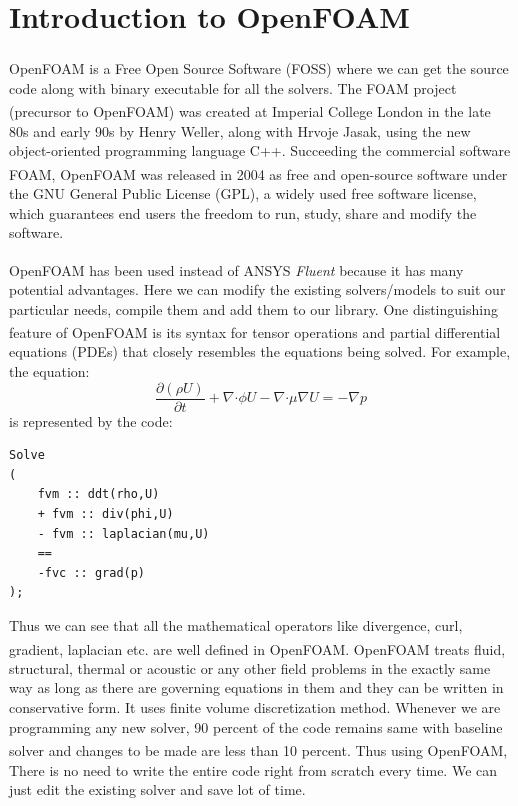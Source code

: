 \chapter{Introduction to OpenFOAM\textsuperscript{\textregistered}}

\label{openfoam}

OpenFOAM\textsuperscript{\textregistered} is a Free Open Source Software (FOSS) where we can get the source code along with binary executable for all the solvers. The FOAM project (precursor to OpenFOAM\textsuperscript{\textregistered}) was created at Imperial College London in the late 80s and early 90s by Henry Weller, along with Hrvoje Jasak, using the new object-oriented programming language C++. Succeeding the commercial software FOAM, OpenFOAM\textsuperscript{\textregistered} was released in 2004 as free and open-source software under the GNU General Public License (GPL), a widely used free software license, which guarantees end users the freedom to run, study, share and modify the software.

OpenFOAM\textsuperscript{\textregistered} has been used instead of ANSYS\textsuperscript{\textregistered} \textit{Fluent} because it has many potential advantages. Here we can modify the existing solvers/models to suit our particular needs, compile them and add them to our library. One distinguishing feature of OpenFOAM\textsuperscript{\textregistered} is its syntax for tensor operations and partial differential equations (PDEs) that closely resembles the equations being solved. For example, the equation: 
\begin{equation}
\dfrac{\partial(\rho U)}{\partial t} + \nabla \boldsymbol{\cdot} \phi U - \nabla \boldsymbol{\cdot} \mu \nabla U = - \nabla p
\end{equation}
is represented by the code: 
\begin{verbatim}
Solve
(
	fvm :: ddt(rho,U)
	+ fvm :: div(phi,U)
	- fvm :: laplacian(mu,U)
	==
	-fvc :: grad(p)
);

\end{verbatim}

Thus we can see that all the mathematical operators like divergence, curl, gradient, laplacian etc. are well defined in OpenFOAM\textsuperscript{\textregistered}. OpenFOAM\textsuperscript{\textregistered} treats fluid, structural, thermal or acoustic or any other field problems in the exactly same way as long as there are governing equations in them and they can be written in conservative form. It uses finite volume discretization method. Whenever we are programming any new solver, 90 percent of the code remains same with baseline solver and changes to be made are less than 10 percent. Thus using OpenFOAM\textsuperscript{\textregistered}, There is no need to write the entire code right from scratch every time. We can just edit the existing solver and save lot of time.

